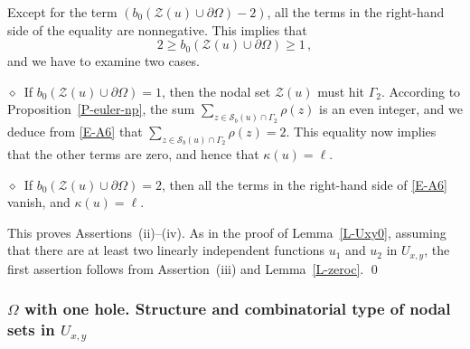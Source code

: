 \documentclass[12pt,a4paper]{amsart}
\theoremstyle{plain} %
\theoremstyle{definition}
\numberwithin{equation}{section}
\numberwithin{figure}{section}
\numberwithin{table}{section}
\newcommand{\cS}{\mathcal{S}}
\newcommand{\cZ}{\mathcal{Z}}
\newcommand{\noid}{\noindent $\diamond$~}
\begin{document}
{Except for the term $\left( b_0(\cZ(u) \cup \partial \Omega) -2\right)$, all the terms in the right-hand side of the equality are nonnegative. This implies that
%
\begin{equation*}
2 \ge b_0(\cZ(u) \cup \partial \Omega) \ge 1\,,
\end{equation*}
and we have to examine two cases.\smallskip

\noid If $b_0(\cZ(u) \cup \partial \Omega) = 1$, then the nodal set $\cZ(u)$ must hit $\Gamma_2$. According to Proposition~\ref{P-euler-np}, the sum $\sum_{z \in \cS_b(u)\cap \Gamma_2} \rho (z)$ is an even integer, and we deduce from \eqref{E-A6} that $\sum_{z \in \cS_b(u)\cap \Gamma_2} \rho (z) = 2$. This equality now implies that the other terms are zero, and hence that $\kappa(u) = \ell$.\smallskip

\noid If $b_0(\cZ(u) \cup \partial \Omega) = 2$, then all the terms in the right-hand side of \eqref{E-A6} vanish, and $\kappa(u) = \ell$. \smallskip

This proves Assertions~(ii)--(iv).  As in the proof of Lemma~\ref{L-Uxy0}, assuming that there are at least two linearly independent functions $u_1$ and $u_2$ in $U_{x,y}$, the first assertion follows from Assertion~(iii)  and Lemma~\ref{L-zeroc}. \hfill \qed\medskip

\subsubsection{$\Omega$ with one hole. Structure and combinatorial type of nodal sets in $U_{x,y}$}\label{SSS-hmn-21cs}

}
\end{document}

